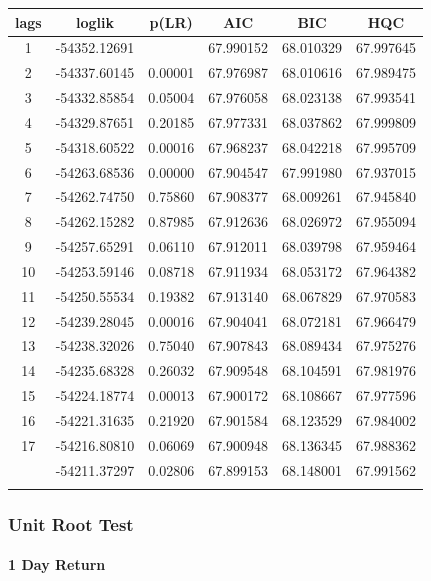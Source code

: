 \begin{center}
\begin{tabular}{ c c c c c c }
lags & loglik & p(LR) & AIC & BIC & HQC \\
\hline
1 & -54352.12691 & & 67.990152 & 68.010329 & 67.997645 \\
2 & -54337.60145 & 0.00001 & 67.976987 & 68.010616 & 67.989475 \\
3 & -54332.85854 & 0.05004 & 67.976058 & 68.023138 & 67.993541 \\
4 & -54329.87651 & 0.20185 & 67.977331 & 68.037862 & 67.999809 \\
5 & -54318.60522 & 0.00016 & 67.968237 & 68.042218 & 67.995709 \\
6 & -54263.68536 & 0.00000 & 67.904547 & 67.991980 & 67.937015 \\
7 & -54262.74750 & 0.75860 & 67.908377 & 68.009261 & 67.945840 \\
8 & -54262.15282 & 0.87985 & 67.912636 & 68.026972 & 67.955094 \\
9 & -54257.65291 & 0.06110 & 67.912011 & 68.039798 & 67.959464 \\
10 & -54253.59146 & 0.08718 & 67.911934 & 68.053172 & 67.964382 \\
11 & -54250.55534 & 0.19382 & 67.913140 & 68.067829 & 67.970583 \\
12 & -54239.28045 & 0.00016 & 67.904041 & 68.072181 & 67.966479 \\
13 & -54238.32026 & 0.75040 & 67.907843 & 68.089434 & 67.975276 \\
14 & -54235.68328 & 0.26032 & 67.909548 & 68.104591 & 67.981976 \\
15 & -54224.18774 & 0.00013 & 67.900172 & 68.108667 & 67.977596 \\
16 & -54221.31635 & 0.21920 & 67.901584 & 68.123529 & 67.984002 \\
17 & -54216.80810 & 0.06069 & 67.900948 & 68.136345 & 67.988362 \\
\arrayrulecolor{red}\hline
18 & -54211.37297 & 0.02806 & 67.899153 & 68.148001 & 67.991562 \\
\arrayrulecolor{red}\hline
\end{tabular}
\end{center}

\subsubsection{Unit Root Test}

\paragraph{1 Day Return}

